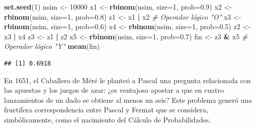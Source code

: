 \documentclass[]{book}
\newenvironment{Shaded}{\begin{snugshade}}{\end{snugshade}}
\newcommand{\KeywordTok}[1]{\textcolor[rgb]{0.13,0.29,0.53}{\textbf{#1}}}
\newcommand{\DataTypeTok}[1]{\textcolor[rgb]{0.13,0.29,0.53}{#1}}
\newcommand{\DecValTok}[1]{\textcolor[rgb]{0.00,0.00,0.81}{#1}}
\newcommand{\FloatTok}[1]{\textcolor[rgb]{0.00,0.00,0.81}{#1}}
\newcommand{\StringTok}[1]{\textcolor[rgb]{0.31,0.60,0.02}{#1}}
\newcommand{\CommentTok}[1]{\textcolor[rgb]{0.56,0.35,0.01}{\textit{#1}}}
\newcommand{\OperatorTok}[1]{\textcolor[rgb]{0.81,0.36,0.00}{\textbf{#1}}}
\newcommand{\NormalTok}[1]{#1}
\theoremstyle{definition}
\theoremstyle{definition}
\theoremstyle{definition}
\theoremstyle{remark}
\let\BeginKnitrBlock\begin \let\EndKnitrBlock\end
\begin{document}
\begin{Shaded}
\begin{Highlighting}[]
\KeywordTok{set.seed}\NormalTok{(}\DecValTok{1}\NormalTok{)}
\NormalTok{nsim <-}\StringTok{ }\DecValTok{10000}
\NormalTok{x1 <-}\StringTok{ }\KeywordTok{rbinom}\NormalTok{(nsim, }\DataTypeTok{size=}\DecValTok{1}\NormalTok{, }\DataTypeTok{prob=}\FloatTok{0.9}\NormalTok{)}
\NormalTok{x2 <-}\StringTok{ }\KeywordTok{rbinom}\NormalTok{(nsim, }\DataTypeTok{size=}\DecValTok{1}\NormalTok{, }\DataTypeTok{prob=}\FloatTok{0.8}\NormalTok{)}
\NormalTok{z1 <-}\StringTok{ }\NormalTok{x1 }\OperatorTok{|}\StringTok{ }\NormalTok{x2   }\CommentTok{# Operador lógico "O"}
\NormalTok{x3 <-}\StringTok{ }\KeywordTok{rbinom}\NormalTok{(nsim, }\DataTypeTok{size=}\DecValTok{1}\NormalTok{, }\DataTypeTok{prob=}\FloatTok{0.6}\NormalTok{)}
\NormalTok{x4 <-}\StringTok{ }\KeywordTok{rbinom}\NormalTok{(nsim, }\DataTypeTok{size=}\DecValTok{1}\NormalTok{, }\DataTypeTok{prob=}\FloatTok{0.5}\NormalTok{)}
\NormalTok{z2 <-}\StringTok{ }\NormalTok{x3 }\OperatorTok{|}\StringTok{ }\NormalTok{x4}
\NormalTok{z3 <-}\StringTok{ }\NormalTok{z1 }\OperatorTok{|}\StringTok{ }\NormalTok{z2}
\NormalTok{x5 <-}\StringTok{ }\KeywordTok{rbinom}\NormalTok{(nsim, }\DataTypeTok{size=}\DecValTok{1}\NormalTok{, }\DataTypeTok{prob=}\FloatTok{0.7}\NormalTok{)}
\NormalTok{fin <-}\StringTok{ }\NormalTok{z3 }\OperatorTok{&}\StringTok{ }\NormalTok{x5  }\CommentTok{# Operador lógico "Y"}
\KeywordTok{mean}\NormalTok{(fin)}
\end{Highlighting}
\end{Shaded}

\begin{verbatim}
## [1] 0.6918
\end{verbatim}

\BeginKnitrBlock{exercise}
\protect\hypertarget{exr:unnamed-chunk-15}{}{\label{exr:unnamed-chunk-15} }
\EndKnitrBlock{exercise} En 1651, el Caballero de Méré le planteó a
Pascal una pregunta relacionada con las apuestas y los juegos de azar:
¿es ventajoso apostar a que en cuatro lanzamientos de un dado se obtiene
al menos un seis? Este problema generó una fructífera correspondencia
entre Pascal y Fermat que se considera, simbólicamente, como el
nacimiento del Cálculo de Probabilidades.
\end{document}
